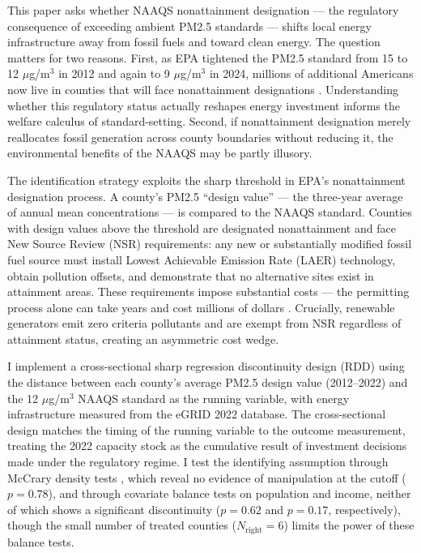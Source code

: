 \documentclass[12pt]{article}
\begin{document}
This paper asks whether NAAQS nonattainment designation --- the regulatory consequence of exceeding ambient PM2.5 standards --- shifts local energy infrastructure away from fossil fuels and toward clean energy. The question matters for two reasons. First, as EPA tightened the PM2.5 standard from 15 to 12 $\mu$g/m$^3$ in 2012 and again to 9 $\mu$g/m$^3$ in 2024, millions of additional Americans now live in counties that will face nonattainment designations \citep{EPA2024NAAQS}. Understanding whether this regulatory status actually reshapes energy investment informs the welfare calculus of standard-setting. Second, if nonattainment designation merely reallocates fossil generation across county boundaries without reducing it, the environmental benefits of the NAAQS may be partly illusory.

The identification strategy exploits the sharp threshold in EPA's nonattainment designation process. A county's PM2.5 ``design value'' --- the three-year average of annual mean concentrations --- is compared to the NAAQS standard. Counties with design values above the threshold are designated nonattainment and face New Source Review (NSR) requirements: any new or substantially modified fossil fuel source must install Lowest Achievable Emission Rate (LAER) technology, obtain pollution offsets, and demonstrate that no alternative sites exist in attainment areas. These requirements impose substantial costs --- the permitting process alone can take years and cost millions of dollars \citep{greenstone2002impact}. Crucially, renewable generators emit zero criteria pollutants and are exempt from NSR regardless of attainment status, creating an asymmetric cost wedge.

I implement a cross-sectional sharp regression discontinuity design (RDD) using the distance between each county's average PM2.5 design value (2012--2022) and the 12 $\mu$g/m$^3$ NAAQS standard as the running variable, with energy infrastructure measured from the eGRID 2022 database. The cross-sectional design matches the timing of the running variable to the outcome measurement, treating the 2022 capacity stock as the cumulative result of investment decisions made under the regulatory regime. I test the identifying assumption through McCrary density tests \citep{cattaneo2020simple}, which reveal no evidence of manipulation at the cutoff ($p = 0.78$), and through covariate balance tests on population and income, neither of which shows a significant discontinuity ($p = 0.62$ and $p = 0.17$, respectively), though the small number of treated counties ($N_{\text{right}} = 6$) limits the power of these balance tests.
\end{document}
